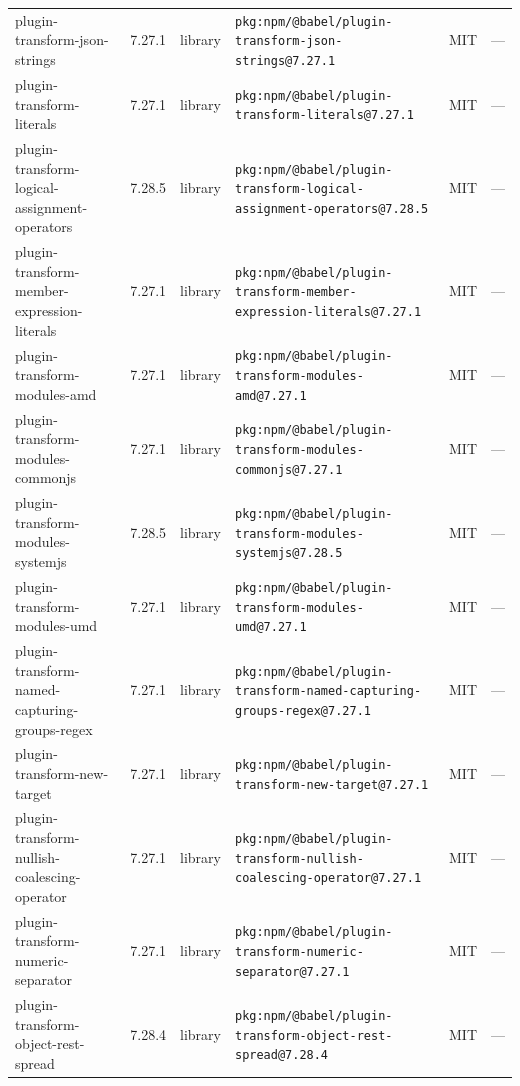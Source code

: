 \documentclass[11pt,a4paper]{article}
\begin{document}
\begin{longtable}{|p{4cm}|p{2cm}|p{1.6cm}|p{5cm}|p{1.5cm}|p{3.5cm}|}
\raggedright plugin-transform-json-strings & 7.27.1 & library & \small\texttt{pkg:npm/@babel/plugin-transform-json-strings@7.27.1} & MIT & \small — \\
\raggedright plugin-transform-literals & 7.27.1 & library & \small\texttt{pkg:npm/@babel/plugin-transform-literals@7.27.1} & MIT & \small — \\
\raggedright plugin-transform-logical-assignment-operators & 7.28.5 & library & \small\texttt{pkg:npm/@babel/plugin-transform-logical-assignment-operators@7.28.5} & MIT & \small — \\
\raggedright plugin-transform-member-expression-literals & 7.27.1 & library & \small\texttt{pkg:npm/@babel/plugin-transform-member-expression-literals@7.27.1} & MIT & \small — \\
\raggedright plugin-transform-modules-amd & 7.27.1 & library & \small\texttt{pkg:npm/@babel/plugin-transform-modules-amd@7.27.1} & MIT & \small — \\
\raggedright plugin-transform-modules-commonjs & 7.27.1 & library & \small\texttt{pkg:npm/@babel/plugin-transform-modules-commonjs@7.27.1} & MIT & \small — \\
\raggedright plugin-transform-modules-systemjs & 7.28.5 & library & \small\texttt{pkg:npm/@babel/plugin-transform-modules-systemjs@7.28.5} & MIT & \small — \\
\raggedright plugin-transform-modules-umd & 7.27.1 & library & \small\texttt{pkg:npm/@babel/plugin-transform-modules-umd@7.27.1} & MIT & \small — \\
\raggedright plugin-transform-named-capturing-groups-regex & 7.27.1 & library & \small\texttt{pkg:npm/@babel/plugin-transform-named-capturing-groups-regex@7.27.1} & MIT & \small — \\
\raggedright plugin-transform-new-target & 7.27.1 & library & \small\texttt{pkg:npm/@babel/plugin-transform-new-target@7.27.1} & MIT & \small — \\
\raggedright plugin-transform-nullish-coalescing-operator & 7.27.1 & library & \small\texttt{pkg:npm/@babel/plugin-transform-nullish-coalescing-operator@7.27.1} & MIT & \small — \\
\raggedright plugin-transform-numeric-separator & 7.27.1 & library & \small\texttt{pkg:npm/@babel/plugin-transform-numeric-separator@7.27.1} & MIT & \small — \\
\raggedright plugin-transform-object-rest-spread & 7.28.4 & library & \small\texttt{pkg:npm/@babel/plugin-transform-object-rest-spread@7.28.4} & MIT & \small — \\

\end{longtable}
\end{document}

